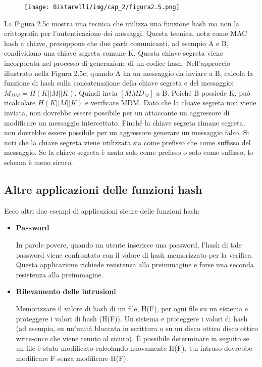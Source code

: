 \begin{figure}[H]
	\centering
    \texttt{[image: Bistarelli/img/cap\_2/figura2.5.png]}
\end{figure}


La Figura 2.5c mostra una tecnica che utilizza una funzione hash ma non la crittografia per l'autenticazione dei messaggi. Questa tecnica, nota come MAC hash a chiave, presuppone che due parti comunicanti, ad esempio A e B, condividano una chiave segreta comune K. Questa chiave segreta viene incorporata nel processo di generazione di un codice hash. Nell'approccio illustrato nella Figura 2.5c, quando A ha un messaggio da inviare a B, calcola la funzione di hash sulla concatenazione della chiave segreta e del messaggio: $M_{DM} = H(K || M || K)$. Quindi invia $[M  MD_{M}]$ a B. Poiché B possiede K, può ricalcolare $H(K ||  M ||  K)$ e verificare MDM. Dato che la chiave segreta non viene inviata, non dovrebbe essere possibile per un attaccante un aggressore di modificare un messaggio intercettato. Finché la chiave segreta rimane segreta, non dovrebbe essere possibile per un aggressore generare un messaggio falso.
Si noti che la chiave segreta viene utilizzata sia come prefisso che come suffisso del messaggio. Se la chiave segreta è usata solo come prefisso o solo come suffisso, lo schema è meno sicuro.

\newpage
\subsection{Altre applicazioni delle funzioni hash}
Ecco altri due esempi di applicazioni sicure delle funzioni hash:

\begin{itemize}
    \item \textbf{Password}
    
    In parole povere, quando un utente inserisce una password, l'hash di tale password viene confrontato con il valore di hash memorizzato per la verifica. Questa applicazione richiede resistenza alla preimmagine e forse una seconda resistenza alla preimmagine.
    
    \item \textbf{Rilevamento delle intrusioni}
    
    Memorizzare il valore di hash di un file, H(F), per ogni file su un sistema e proteggere i valori di hash (H(F)).
    Un sistema e proteggere i valori di hash (ad esempio, su un'unità bloccata in scrittura o su un disco ottico disco ottico write-once che viene tenuto al sicuro). È possibile determinare in seguito se un file è stato modificato calcolando nuovamente H(F). Un intruso dovrebbe modificare F senza modificare H(F).
\end{itemize}

